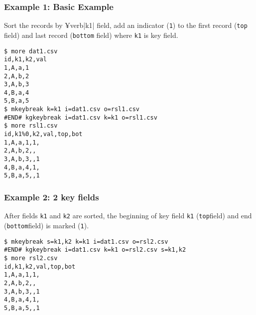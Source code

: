 \subsubsection*{Example 1: Basic Example}

Sort the records by ¥verb|k1| field, add an indicator (\verb|1|) to the first record (\verb|top| field) and last record (\verb|bottom| field) where \verb|k1| is key field.


\begin{Verbatim}[baselinestretch=0.7,frame=single]
$ more dat1.csv
id,k1,k2,val
1,A,a,1
2,A,b,2
3,A,b,3
4,B,a,4
5,B,a,5
$ mkeybreak k=k1 i=dat1.csv o=rsl1.csv
#END# kgkeybreak i=dat1.csv k=k1 o=rsl1.csv
$ more rsl1.csv
id,k1%0,k2,val,top,bot
1,A,a,1,1,
2,A,b,2,,
3,A,b,3,,1
4,B,a,4,1,
5,B,a,5,,1
\end{Verbatim}
\subsubsection*{Example 2: 2 key fields}

After fields \verb|k1| and \verb|k2| are sorted, the beginning of key field \verb|k1| (\verb|top|field) and end (\verb|bottom|field) is marked (\verb|1|).


\begin{Verbatim}[baselinestretch=0.7,frame=single]
$ mkeybreak s=k1,k2 k=k1 i=dat1.csv o=rsl2.csv
#END# kgkeybreak i=dat1.csv k=k1 o=rsl2.csv s=k1,k2
$ more rsl2.csv
id,k1,k2,val,top,bot
1,A,a,1,1,
2,A,b,2,,
3,A,b,3,,1
4,B,a,4,1,
5,B,a,5,,1
\end{Verbatim}
